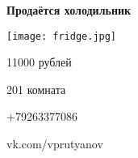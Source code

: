 \documentclass[a4paper,24pt]{article}
\begin{document}
\begin{titlepage}
	\centering
	{\Huge \bfseries Продаётся холодильник \par}
	\vspace{\baselineskip}
	\texttt{[image: fridge.jpg]}
	\newline
	\vspace{\baselineskip}
	\newline
	{\huge 11000 рублей \par}
	{\huge 201 комната \par}
	{\huge +79263377086 \par}
	{\huge vk.com/vprutyanov \par}
\end{titlepage}
\end{document}
